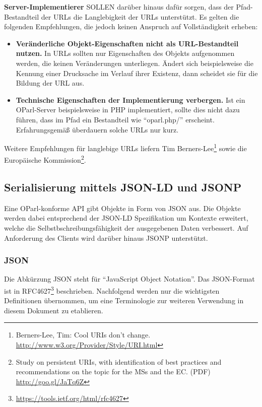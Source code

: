 \documentclass[,a4paper]{article}
\begin{document}
\textbf{Server-Implementierer} SOLLEN darüber hinaus dafür sorgen, dass
der Pfad-Bestandteil der URLs die Langlebigkeit der URLs unterstützt. Es
gelten die folgenden Empfehlungen, die jedoch keinen Anspruch auf
Vollständigkeit erheben:

\begin{itemize}
\item
  \textbf{Veränderliche Objekt-Eigenschaften nicht als URL-Bestandteil
  nutzen.} In URLs sollten nur Eigenschaften des Objekts aufgenommen
  werden, die keinen Veränderungen unterliegen. Ändert sich
  beispielsweise die Kennung einer Drucksache im Verlauf ihrer Existenz,
  dann scheidet sie für die Bildung der URL aus.
\item
  \textbf{Technische Eigenschaften der Implementierung verbergen.} Ist
  ein OParl-Server beispielsweise in PHP implementiert, sollte dies
  nicht dazu führen, dass im Pfad ein Bestandteil wie ``oparl.php/''
  erscheint. Erfahrungsgemäß überdauern solche URLs nur kurz.
\end{itemize}

Weitere Empfehlungen für langlebige URLs liefern Tim
Berners-Lee\footnote{Berners-Lee, Tim: Cool URIs don't change.
  \url{http://www.w3.org/Provider/Style/URI.html}} sowie die Europäische
Kommission\footnote{Study on persistent URIs, with identification of
  best practices and recommendations on the topic for the MSs and the
  EC. (PDF) \url{http://goo.gl/JaTq6Z}}.

\subsection{Serialisierung mittels JSON-LD und JSONP}

Eine OParl-konforme API gibt Objekte in Form von JSON aus. Die Objekte
werden dabei entsprechend der JSON-LD Spezifikation um Kontexte
erweitert, welche die Selbstbschreibungsfähigkeit der ausgegebenen Daten
verbessert. Auf Anforderung des Clients wird darüber hinaus JSONP
unterstützt.

\subsubsection{JSON}

Die Abkürzung JSON steht für ``JavaScript Object Notation''. Das
JSON-Format ist in RFC4627\footnote{\url{https://tools.ietf.org/html/rfc4627}}
beschrieben. Nachfolgend werden nur die wichtigsten Definitionen
übernommen, um eine Terminologie zur weiteren Verwendung in diesem
Dokument zu etablieren.
\end{document}
